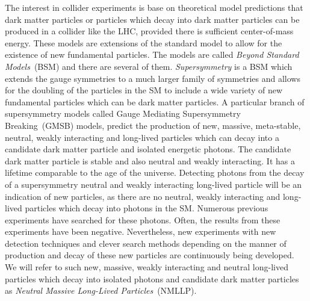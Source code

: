 The interest in collider experiments is base on theoretical model predictions that dark matter particles or particles which decay into dark matter particles can be produced in a collider like the LHC, provided there is sufficient center-of-mass energy. These models are extensions of the standard model to allow for the existence of new fundamental particles. The models are called \textit{Beyond Standard Models}~(BSM) and there are several of them. \textit{Supersymmetry} is a BSM which extends the gauge symmetries to a much larger family of symmetries and allows for the doubling of the particles in the SM to include a wide variety of new fundamental particles which can be dark matter particles\cite{SUSYDM,LSPDM}. A particular branch of supersymmetry models called Gauge Mediating Supersymmetry Breaking~(GMSB) models, predict the production of new, massive, meta-stable, neutral, weakly interacting and long-lived particles which can decay into a candidate dark matter particle and isolated energetic photons. The candidate dark matter particle is stable and also neutral and weakly interacting. It has a lifetime comparable to the age of the universe. Detecting photons from the decay of a supersymmetry neutral and weakly interacting long-lived particle will be an indication of new particles, as there are no neutral, weakly interacting and long-lived particles which decay into photons in the SM. Numerous previous experiments have searched for these photons. Often, the results from these experiments have been negative. Nevertheless, new experiments with new detection techniques and clever search methods depending on the manner of production and decay of these new particles are continuously being developed. 
We will refer to such new, massive, weakly interacting and neutral long-lived particles which decay into isolated photons and candidate dark matter particles  as \textit{Neutral Massive Long-Lived Particles}~(NMLLP).
